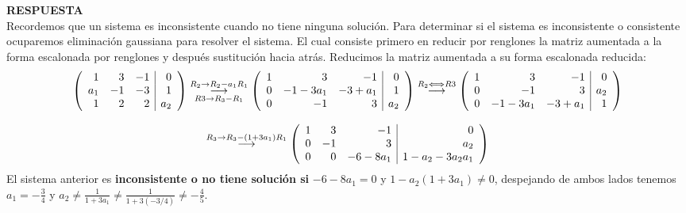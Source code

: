 \documentclass[11pt,letterpaper]{article}
\newcommand{\res}{\textbf{RESPUESTA}\\}
\newcommand{\grstep}[2][\relax]{%
   \ensuremath{\mathrel{
       {\mathop{\longrightarrow}\limits^{#2\mathstrut}_{
                                     \begin{subarray}{l} #1 \end{subarray}}}}}}
\begin{document}
\begin{enumerate}
\res Recordemos que un sistema es inconsistente cuando no tiene ninguna solución. Para determinar si el sistema es inconsistente o consistente ocuparemos eliminación gaussiana para resolver el sistema. El cual consiste primero en reducir por renglones la matriz aumentada a la forma escalonada por renglones y después sustitución hacia atrás. Reducimos la matriz aumentada a su forma escalonada reducida: 
\begin{equation*}
\begin{array}{c}
\left( \begin{array}{rrr|r}
1 & 3 & -1 & 0\\
a_1 & -1 & -3 & 1 \\
1 & 2 & 2 & a_2
\end{array} \right) %
\grstep[R3 \rightarrow R_3 -R_1]{R_2 \rightarrow R_2 -a_1R_1}
%
\left( \begin{array}{rrr|r}
1 & 3 & -1 & 0\\
0 & -1-3a_1 & -3+a_1 & 1 \\
0 & -1 & 3 & a_2
\end{array} \right) %
\grstep[]{R_2 \Longleftrightarrow R3}
%
\left( \begin{array}{rrr|r}
1 & 3 & -1 & 0\\
0 & -1 & 3 & a_2\\
0 & -1-3a_1 & -3+a_1 & 1 \\
\end{array} \right)\\
\\
%
\grstep[]{R_3 \rightarrow R_3-(1+3a_1)R_1}
%
\left( \begin{array}{rrr|r}
1 &  3 & -1 & 0\\
0 & -1 & 3 & a_2\\
0 &  0 & -6-8a_1 &  1-a_2-3a_2a_1\\
\end{array} \right)
\end{array}
\end{equation*}
El sistema anterior es \textbf{inconsistente o no tiene solución si} $-6-8a_1=0$ y $1-a_2(1+3a_1)\neq 0$, despejando de ambos lados tenemos $a_1=-\frac{3}{4}$ y $ a_2\neq \frac{1}{1+3a_1} \neq \frac{1}{1+3(-3/4)} \neq -\frac{4}{5}$.\\


\end{enumerate}
\end{document}
